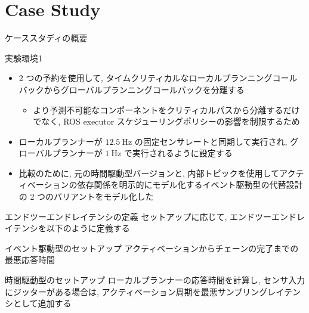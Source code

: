 
\section{Case Study}
\label{sec: case study}

\begin{frame}{ケーススタディの概要}
\end{frame}

\begin{frame}{実験環境1}
    \begin{itemize}
        \item 2 つの予約を使用して, タイムクリティカルなローカルプランニングコールバックからグローバルプランニングコールバックを分離する
              \begin{itemize}
                  \item より予測不可能なコンポーネントをクリティカルパスから分離するだけでなく, ROS executor スケジューリングポリシーの影響を制限するため
              \end{itemize}
        \item ローカルプランナーが $12.5 \mathrm{~Hz}$ の固定センサレートと同期して実行され, グローバルプランナーが $1 \mathrm{~Hz}$ で実行されるように設定する
        \item 比較のために, 元の時間駆動型バージョンと, 内部トピックを使用してアクティベーションの依存関係を明示的にモデル化するイベント駆動型の代替設計の 2 つのバリアントをモデル化した
    \end{itemize}
\end{frame}

\begin{frame}{エンドツーエンドレイテンシの定義}
    セットアップに応じて, エンドツーエンドレイテンシを以下のように定義する
    \begin{block}{イベント駆動型のセットアップ}
        アクティベーションからチェーンの完了までの最悪応答時間
    \end{block}
    \begin{block}{時間駆動型のセットアップ}
        ローカルプランナーの応答時間を計算し, センサ入力にジッターがある場合は, アクティベーション周期を最悪サンプリングレイテンシとして追加する
    \end{block}
\end{frame}

